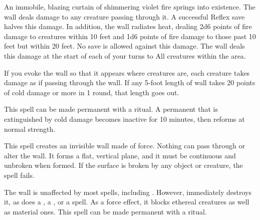 \spellrng{\rngmed}
\spelldur{\durshort}
\begin{spelleffect}
  An immobile, blazing curtain of shimmering violet fire springs into existence. The wall deals damage to any creature passing through it. A successful Reflex save halves this damage. In addition, the wall radiates heat, dealing 2d6 points of fire damage to creatures within 10 feet and 1d6 points of fire damage to those past 10 feet but within 20 feet. No save is allowed against this damage. The wall deals this damage at the start of each of your turns to All creatures within the area.
  \par If you evoke the wall so that it appears where creatures are, each creature takes damage as if passing through the wall. If any 5-foot length of wall takes 20 points of cold damage or more in 1 round, that length goes out.
\end{spelleffect}
\begin{spellnotes}
This spell can be made permanent with a  ritual. A permanent  that is extinguished by cold damage becomes inactive for 10 minutes, then reforms at normal strength.
\end{spellnotes}

\spellrng{\rngmed}
\begin{spelleffect}
  This spell creates an invisible wall made of force. Nothing can pass through or alter the wall. It forms a flat, vertical plane, and it must be continuous and unbroken when formed. If the surface is broken by any object or creature, the spell fails.
\end{spelleffect}
\begin{spellnotes}
  The wall is unaffected by most spells, including . However,  immediately destroys it, as does a , a , or a  spell. As a force effect, it blocks ethereal creatures as well as material ones.
This spell can be made permanent with a  ritual.
\end{spellnotes}

